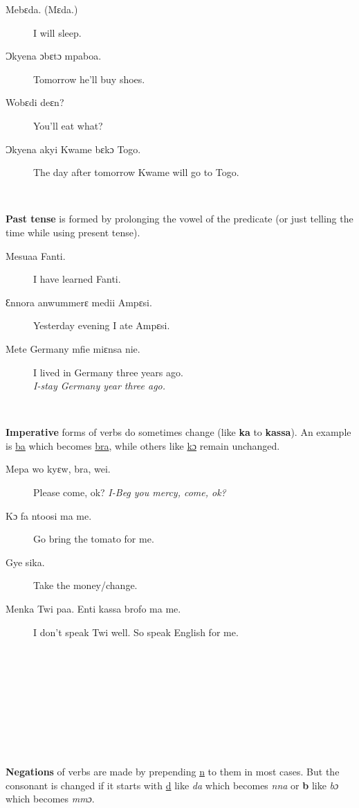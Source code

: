 \documentclass[%
 fontsize=11pt,%
 a5paper,pagesize,
 paper=a5,%
 DIV=9,%
 parskip=half*,%
 twoside=true,
 pointlessnumbers
]{scrbook}%
\begin{document}
\begin{description}
  \item[Mebɛda. (Mɛda.)] I will sleep.
  \item[Ɔkyena ɔbɛtɔ mpaboa.] Tomorrow he'll buy shoes.
  \item[Wobɛdi deɛn?] You'll eat what?
  \item[Ɔkyena akyi Kwame bɛkɔ Togo.] The day after tomorrow Kwame will go to Togo.
\end{description}



~


\textbf{Past tense} is formed by prolonging the vowel of the predicate (or just telling the time while using present tense).

\begin{description}
  \item[Mesuaa Fanti.] I have learned Fanti.
  \item[Ɛnnora anwummerɛ medii Ampɛsi.] Yesterday evening I ate Ampɛsi.
  \item[Mete Germany mfie miɛnsa nie.] I lived in Germany three years ago. \\
    \textit{I-stay Germany year three ago.}
\end{description}


~


\textbf{Imperative} forms of verbs do sometimes change (like \textbf{ka} to \textbf{kassa}). An example is \underline{ba} which becomes \underline{bra}, while others like \underline{kɔ} remain unchanged.

\begin{description}
  \item[Mepa wo kyɛw, bra, wei.] Please come, ok?
    \textit{I-Beg you mercy, come, ok?}
  \item[Kɔ fa ntoosi ma me.] Go bring the tomato for me.
  \item[Gye sika.] Take the money/change.
  \item[Menka Twi paa. Enti kassa brofo ma me.] I don't speak Twi well. So speak English for me.
\end{description}


~


~


~


~


~


\textbf{Negations} of verbs are made by prepending \underline{n} to them in most cases. But the consonant is changed if it starts with \underline{d} like \textit{da} which becomes \textit{nna} or \textbf{b} like \textit{bɔ} which becomes \textit{mmɔ}.
\end{document}

